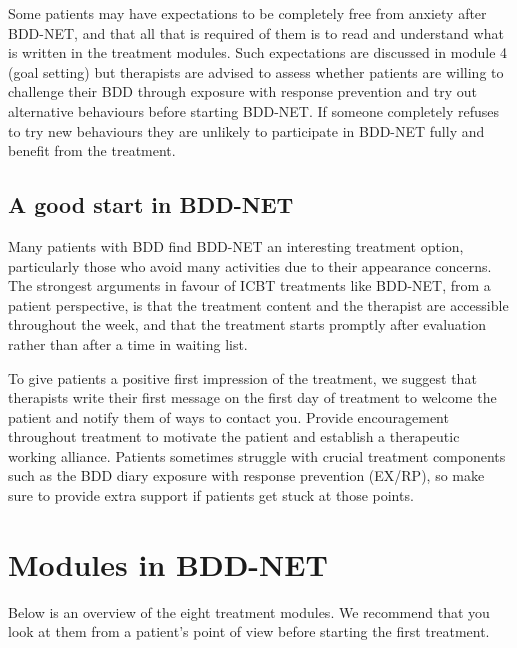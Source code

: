 \documentclass[]{book}
\theoremstyle{definition}
\theoremstyle{definition}
\theoremstyle{definition}
\theoremstyle{remark}
\begin{document}
Some patients may have expectations to be completely free from anxiety
after BDD-NET, and that all that is required of them is to read and
understand what is written in the treatment modules. Such expectations
are discussed in module 4 (goal setting) but therapists are advised to
assess whether patients are willing to challenge their BDD through
exposure with response prevention and try out alternative behaviours
before starting BDD-NET. If someone completely refuses to try new
behaviours they are unlikely to participate in BDD-NET fully and benefit
from the treatment.

\hypertarget{a-good-start-in-bdd-net}{%
\subsection{A good start in BDD-NET}\label{a-good-start-in-bdd-net}}

Many patients with BDD find BDD-NET an interesting treatment option,
particularly those who avoid many activities due to their appearance
concerns. The strongest arguments in favour of ICBT treatments like
BDD-NET, from a patient perspective, is that the treatment content and
the therapist are accessible throughout the week, and that the treatment
starts promptly after evaluation rather than after a time in waiting
list.

To give patients a positive first impression of the treatment, we
suggest that therapists write their first message on the first day of
treatment to welcome the patient and notify them of ways to contact you.
Provide encouragement throughout treatment to motivate the patient and
establish a therapeutic working alliance. Patients sometimes struggle
with crucial treatment components such as the BDD diary exposure with
response prevention (EX/RP), so make sure to provide extra support if
patients get stuck at those points.

\hypertarget{modules-in-bdd-net}{%
\section{Modules in BDD-NET}\label{modules-in-bdd-net}}

Below is an overview of the eight treatment modules. We recommend that
you look at them from a patient's point of view before starting the
first treatment.
\end{document}
